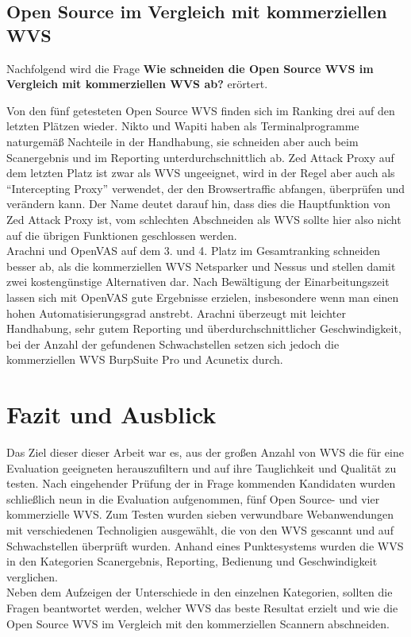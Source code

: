 \documentclass[12pt,oneside,a4paper,parskip,pointlessnumbers]{scrbook}
\begin{document}
  \section{Open Source im Vergleich mit kommerziellen WVS}
  Nachfolgend wird die Frage \textbf{Wie schneiden die Open Source WVS im Vergleich mit kommerziellen WVS ab?} erörtert.

  Von den fünf getesteten Open Source WVS finden sich im Ranking drei auf den letzten Plätzen wieder. Nikto und Wapiti haben als Terminalprogramme naturgemäß Nachteile in der Handhabung, sie schneiden aber auch beim Scanergebnis und im Reporting unterdurchschnittlich ab. Zed Attack Proxy auf dem letzten Platz ist zwar als WVS ungeeignet, wird in der Regel aber auch als ``Intercepting Proxy'' verwendet, der den Browsertraffic abfangen, überprüfen und verändern kann. Der Name deutet darauf hin, dass dies die Hauptfunktion von Zed Attack Proxy ist, vom schlechten Abschneiden als WVS sollte hier also nicht auf die übrigen Funktionen geschlossen werden.\\
  Arachni und OpenVAS auf dem 3. und 4. Platz im Gesamtranking schneiden besser ab, als die kommerziellen WVS Netsparker und Nessus und stellen damit zwei kostengünstige Alternativen dar. Nach Bewältigung der Einarbeitungszeit lassen sich mit OpenVAS gute Ergebnisse erzielen, insbesondere wenn man einen hohen Automatisierungsgrad anstrebt.
  Arachni überzeugt mit leichter Handhabung, sehr gutem Reporting und überdurchschnittlicher Geschwindigkeit, bei der Anzahl der gefundenen Schwachstellen setzen sich jedoch die kommerziellen WVS BurpSuite Pro und Acunetix durch.


\chapter{Fazit und Ausblick}
Das Ziel dieser dieser Arbeit war es, aus der großen Anzahl von WVS die für eine Evaluation geeigneten herauszufiltern und auf ihre Tauglichkeit und Qualität zu testen. Nach eingehender Prüfung der in Frage kommenden Kandidaten wurden schließlich neun in die Evaluation aufgenommen, fünf Open Source- und vier kommerzielle WVS.
Zum Testen wurden sieben verwundbare Webanwendungen mit verschiedenen Technoligien ausgewählt, die von den WVS gescannt und auf Schwachstellen überprüft wurden. Anhand eines Punktesystems wurden die WVS in den Kategorien Scanergebnis, Reporting, Bedienung und Geschwindigkeit verglichen.\\
Neben dem Aufzeigen der Unterschiede in den einzelnen Kategorien, sollten die Fragen beantwortet werden, welcher WVS das beste Resultat erzielt und wie die Open Source WVS im Vergleich mit den kommerziellen Scannern abschneiden.
\end{document}
